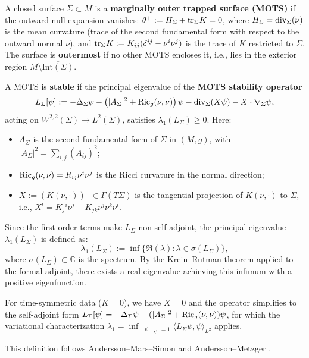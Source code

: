 \begin{definition}\label{def:MOTS}
A closed surface $\Sigma \subset M$ is a \textbf{marginally outer trapped surface (MOTS)} if the outward null expansion vanishes: $\theta^+ := H_\Sigma + \mathrm{tr}_\Sigma K = 0$, where $H_\Sigma = \mathrm{div}_\Sigma(\nu)$ is the mean curvature (trace of the second fundamental form with respect to the outward normal $\nu$), and $\mathrm{tr}_\Sigma K := K_{ij}(\delta^{ij} - \nu^i\nu^j)$ is the trace of $K$ restricted to $\Sigma$. The surface is \textbf{outermost} if no other MOTS encloses it, i.e., lies in the exterior region $M \setminus \overline{\mathrm{Int}(\Sigma)}$.

A MOTS is \textbf{stable} if the principal eigenvalue of the \textbf{MOTS stability operator}
\begin{equation}\label{eq:stability-operator}
L_\Sigma[\psi] := -\Delta_\Sigma \psi - \left(|A_\Sigma|^2 + \mathrm{Ric}_g(\nu,\nu)\right)\psi - \mathrm{div}_\Sigma(X\psi) - X \cdot \nabla_\Sigma\psi,
\end{equation}
acting on $W^{2,2}(\Sigma) \to L^2(\Sigma)$, satisfies $\lambda_1(L_\Sigma) \geq 0$. Here:
\begin{itemize}
    \item $A_\Sigma$ is the second fundamental form of $\Sigma$ in $(M,g)$, with $|A_\Sigma|^2 = \sum_{i,j}(A_{ij})^2$;
    \item $\mathrm{Ric}_g(\nu,\nu) = R_{ij}\nu^i\nu^j$ is the Ricci curvature in the normal direction;
    \item $X := (K(\nu, \cdot))^\top \in \Gamma(T\Sigma)$ is the tangential projection of $K(\nu, \cdot)$ to $\Sigma$, i.e., $X^i = K_j{}^i\nu^j - K_{jk}\nu^j\nu^k\nu^i$.
\end{itemize}
Since the first-order terms make $L_\Sigma$ non-self-adjoint, the principal eigenvalue $\lambda_1(L_\Sigma)$ is defined as:
\[
\lambda_1(L_\Sigma) := \inf\{\Re(\lambda) : \lambda \in \sigma(L_\Sigma)\},
\]
where $\sigma(L_\Sigma) \subset \mathbb{C}$ is the spectrum. By the Krein--Rutman theorem \cite{kreinrutman1948} applied to the formal adjoint, there exists a real eigenvalue achieving this infimum with a positive eigenfunction.

For time-symmetric data ($K = 0$), we have $X = 0$ and the operator simplifies to the self-adjoint form $L_\Sigma[\psi] = -\Delta_\Sigma \psi - (|A_\Sigma|^2 + \mathrm{Ric}_g(\nu,\nu))\psi$, for which the variational characterization $\lambda_1 = \inf_{\|\psi\|_{L^2} = 1} \langle L_\Sigma\psi, \psi\rangle_{L^2}$ applies.

This definition follows Andersson--Mars--Simon \cite{anderssonmars2008} and Andersson--Metzger \cite{anderssonmetzger2009}.
\end{definition}

